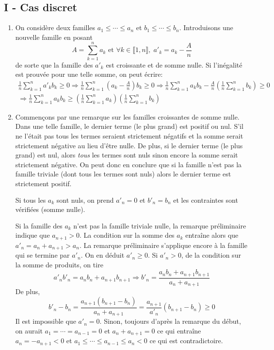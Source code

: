 \subsection*{I - Cas discret}
\begin{enumerate}
 \item On considère deux familles $a_1\leq \cdots \leq a_n$ et $b_1\leq \cdots \leq b_n$. Introduisons une nouvelle famille en posant
\begin{displaymath}
 A = \sum_{k=1}^n a_k \text{ et } \forall k\in \llbracket 1, n \rrbracket, \; a'_k = a_k - \frac{A}{n} 
\end{displaymath}
de sorte que la famille des $a'_k$ est croissante et de somme nulle. Si l'inégalité est prouvée pour une telle somme, on peut écrire:
\begin{multline*}
 \frac{1}{n}\sum_{k=1}^na'_kb_k \geq 0 
\Rightarrow
\frac{1}{n}\sum_{k=1}^n(a_k-\frac{A}{n})b_k \geq 0 
\Rightarrow
\frac{1}{n}\sum_{k=1}^na_kb_k  -\frac{A}{n}\left(\frac{1}{n}\sum_{k=1}^nb_k\right)\geq 0 \\
 \Rightarrow
\frac{1}{n}\sum_{k=1}^na_kb_k \geq \left(\frac{1}{n}\sum_{k=1}^na_k\right)\left(\frac{1}{n}\sum_{k=1}^nb_k\right)
\end{multline*}
  
 \item Commençons par une remarque sur les familles croissantes de somme nulle.\newline
Dans une telle famille, le dernier terme (le plus grand) est positif ou nul. S'il ne l'était pas tous les termes seraient strictement négatifs et la somme serait strictement négative au lieu d'être nulle. De plus, si le dernier terme (le plus grand) est nul, alors \emph{tous} les termes sont nuls sinon encore la somme serait strictement négative. On peut donc en conclure que si la famille n'est pas la famille triviale (dont tous les termes sont nuls) alors le dernier terme est strictement positif.

Si tous les $a_k$ sont nuls, on prend $a'_n=0$ et $b'_n = b_n$ et les contraintes sont vérifiées (somme nulle).

Si la famille des $a_k$ n'est pas la famille triviale nulle, la remarque préliminaire indique que $a_{n+1}>0$. La condition sur la somme des $a_k$ entraîne alors que $a'_n = a_{n}+a_{n+1} > a_n$. La remarque préliminaire s'applique encore à la famille qui se termine par $a'_n$. On en déduit $a'_n\geq 0$.\newline
Si $a'_n > 0$, de la condition sur la somme de produits, on tire 
\begin{displaymath}
 a'_nb'_n = a_{n}b_{n}+ a_{n+1}b_{n+1} \Rightarrow b'_n = \frac{a_{n}b_{n}+ a_{n+1}b_{n+1}}{a_{n}+a_{n+1}}
\end{displaymath}
De plus,
\begin{displaymath}
 b'_n - b_n = \frac{a_{n+1}(b_{n+1} - b_n)}{a_n + a_{n+1}} = \frac{a_{n+1}}{a'_n}(b_{n+1}-b_n)\geq 0
\end{displaymath}
Il est impossible que $a'_n=0$. Sinon, toujours d'après la remarque du début, on aurait $a_1 = \cdots = a_{n-1} = 0$ et $a_n + a_{n+1}=0$ ce qui entraîne $a_n = - a_{n+1} <0$ et $a_1 \leq \cdots \leq a_{n-1} \leq a_n <0$ ce qui est contradictoire.


\end{enumerate}
